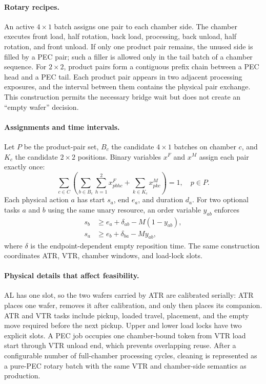 \documentclass[letterpaper]{article}
\begin{document}
\paragraph{Rotary recipes.}
An active $4\times1$ batch assigns one pair to each chamber side.
The chamber executes front load, half rotation, back load, processing, back unload, half rotation, and front unload.
If only one product pair remains, the unused side is filled by a PEC pair; such a filler is allowed only in the tail batch of a chamber sequence.
For $2\times2$, product pairs form a contiguous prefix chain between a PEC head and a PEC tail.
Each product pair appears in two adjacent processing exposures, and the interval between them contains the physical pair exchange.
This construction permits the necessary bridge wait but does not create an ``empty wafer'' decision.

\paragraph{Assignments and time intervals.}
Let $P$ be the product-pair set, $B_c$ the candidate $4\times1$ batches on chamber $c$, and $K_c$ the candidate $2\times2$ positions.
Binary variables $x^F$ and $x^M$ assign each pair exactly once:
\begin{equation}
\sum_{c\in C}\left(
\sum_{b\in B_c}\sum_{h=1}^{2}x^F_{pbhc}
+\sum_{k\in K_c}x^M_{pkc}\right)=1,
\quad p\in P.
\label{eq:assignment}
\end{equation}
Each physical action $a$ has start $s_a$, end $e_a$, and duration $d_a$.
For two optional tasks $a$ and $b$ using the same unary resource, an order variable $y_{ab}$ enforces
\begin{align}
s_b &\ge e_a+\delta_{ab}-M(1-y_{ab}),\\
s_a &\ge e_b+\delta_{ba}-My_{ab},
\label{eq:resource}
\end{align}
where $\delta$ is the endpoint-dependent empty reposition time.
The same construction coordinates ATR, VTR, chamber windows, and load-lock slots.

\paragraph{Physical details that affect feasibility.}
AL has one slot, so the two wafers carried by ATR are calibrated serially: ATR places one wafer, removes it after calibration, and only then places its companion.
ATR and VTR tasks include pickup, loaded travel, placement, and the empty move required before the next pickup.
Upper and lower load locks have two explicit slots.
A PEC job occupies one chamber-bound token from VTR load start through VTR unload end, which prevents overlapping reuse.
After a configurable number of full-chamber processing cycles, cleaning is represented as a pure-PEC rotary batch with the same VTR and chamber-side semantics as production.
\end{document}
